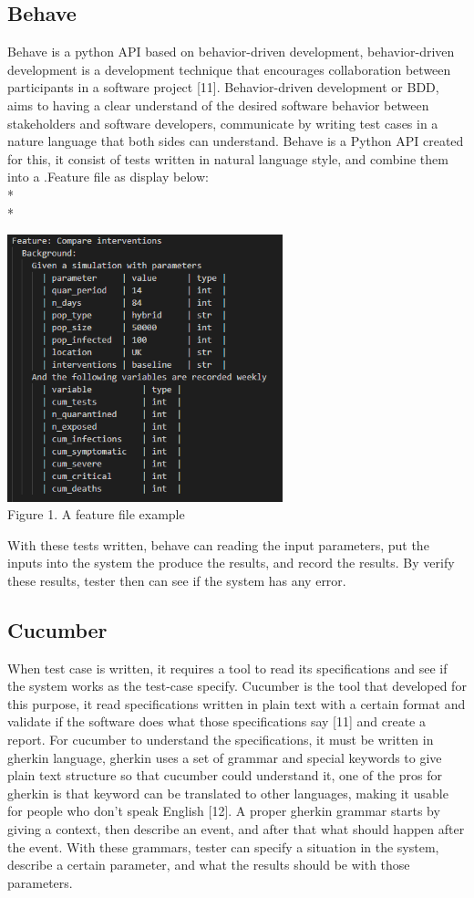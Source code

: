 \subsection{Behave}
Behave is a python API based on behavior-driven development, behavior-driven development is a development technique that encourages collaboration between participants in a software project [11]. Behavior-driven development or BDD, aims to having a clear understand of the desired software behavior between stakeholders and software developers, communicate by writing test cases in a nature language that both sides can understand. Behave is a Python API created for this, it consist of tests written in natural language style, and combine them into a .Feature file as display below: \\*\\*
\begin{center}
\includegraphics[width=8cm]{figures/featureFile.png}\\
Figure 1. A feature file example
\end{center}
With these tests written, behave can reading the input parameters, put the inputs into the system the produce the results, and record the results. By verify these results, tester then can see if the system has any error. 
\subsection{Cucumber}
When test case is written, it requires a tool to read its specifications and see if the system works as the test-case specify. Cucumber is the tool that developed for this purpose, it read specifications written in plain text with a certain format and validate if the software does what those specifications say [11] and create a report. For cucumber to understand the specifications, it must be written in gherkin language, gherkin uses a set of grammar and special keywords to give plain text structure so that cucumber could understand it, one of the pros for gherkin is that keyword can be translated to other languages, making it usable for people who don’t speak English [12]. A proper gherkin grammar starts by giving a context, then describe an event, and after that what should happen after the event. With these grammars, tester can specify a situation in the system, describe a certain parameter, and what the results should be with those parameters.

